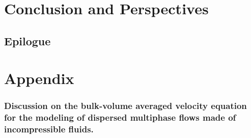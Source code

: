\documentclass[12pt,a4paper,oneside,openany]{My_book}
\begin{document}


\part*{Conclusion and Perspectives}


\chapter*{Epilogue}




\appendix
\renewcommand{\thesection}{\Alph{section}}
\renewcommand{\thesubsection}{\Alph{section}.\arabic{subsection}}
\part*{Appendix}








% 
% 
% 
% 
% 
% 













\section{
Discussion on the bulk-volume averaged velocity equation for the modeling of dispersed multiphase flows made of incompressible fluids. 
}
\label{ap:momentum_formulation}




\end{document}
